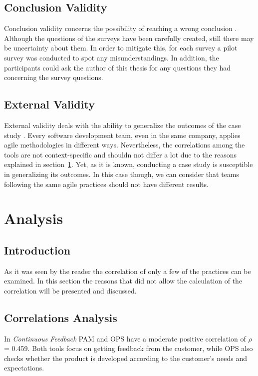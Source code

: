 \subsection{Conclusion Validity}
Conclusion validity concerns the possibility of reaching a wrong conclusion \cite{Wohlin}. Although the questions of the surveys have been carefully created, still there may be uncertainty about them. In order to mitigate this, for each survey a pilot survey was conducted to spot any misunderstandings. In addition, the participants could ask the author of this thesis for any questions they had concerning the survey questions.

\subsection{External Validity}
External validity deals with the ability to generalize the outcomes of the case study \cite{Wohlin}. Every software development team, even in the same company, applies agile methodologies in different ways. Nevertheless, the correlations among the tools are not context-specific and shouldn not differ a lot due to the reasons explained in section~\ref{sec:analysis}. Yet, as it is known, conducting a case study is susceptible in generalizing its outcomes. In this case though, we can consider that teams following the same agile practices should not have different results.

\section{Analysis}
\label{sec:analysis}

\subsection{Introduction}
As it was seen by the reader the correlation of only a few of the practices can be examined. In this section the reasons that did not allow the calculation of the correlation will be presented and discussed.

\subsection{Correlations Analysis}
\label{subsec:correlation_analysis}

In \textit{Continuous Feedback} PAM and OPS have a moderate positive correlation of $\rho$ = 0.459. Both tools focus on getting feedback from the customer, while OPS also checks whether the product is developed according to the customer's needs and expectations.

